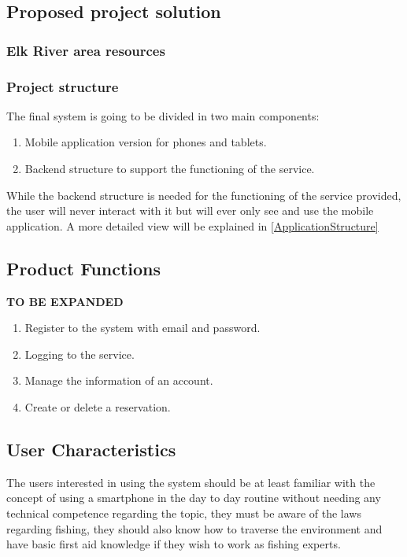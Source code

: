 

\subsection{Proposed project solution}
\subsubsection*{Elk River area resources}

\subsubsection*{Project structure}
The final system is going to be divided in two main components:
\begin{enumerate}
\item Mobile application version for phones and tablets.
\item Backend structure to support the functioning of the service.
\end{enumerate}
While the backend structure is needed for the functioning of the service provided, the user will never interact with it but will ever only see and use the mobile application. A more detailed view will be explained in \ref{ApplicationStructure} \\

\subsection{Product Functions}
\textbf{TO BE EXPANDED}
\begin{enumerate}
\item Register to the system with email and password.
\item Logging to the service.
\item Manage the information of an account.
\item Create or delete a reservation.
\end{enumerate}
\par
\subsection{User Characteristics}
The users interested in using the system should be at least familiar with the concept of using a smartphone in the day to day routine without needing any technical competence regarding the topic, they must be aware of the laws regarding fishing, they should also know how to traverse the environment and have basic first aid knowledge if they wish to work as fishing experts.
\newpage
